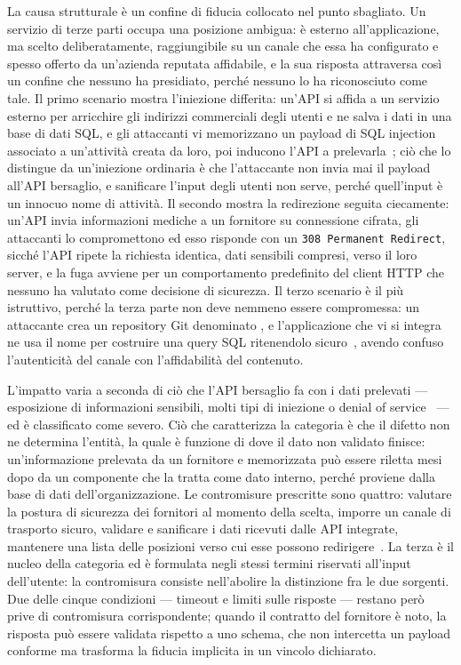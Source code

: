 La causa strutturale è un confine di fiducia collocato nel punto sbagliato. Un
servizio di terze parti occupa una posizione ambigua: è esterno
all'applicazione, ma scelto deliberatamente, raggiungibile su un canale che
essa ha configurato e spesso offerto da un'azienda reputata affidabile, e la
sua risposta attraversa così un confine che nessuno ha presidiato, perché
nessuno lo ha riconosciuto come tale. Il primo scenario mostra l'iniezione
differita: un'API si affida a un servizio esterno per arricchire gli indirizzi
commerciali degli utenti e ne salva i dati in una base di dati SQL, e gli
attaccanti vi memorizzano un payload di SQL injection associato a un'attività
creata da loro, poi inducono l'API a prelevarla~\cite{owasp2023api10}; ciò che
lo distingue da un'iniezione ordinaria è che l'attaccante non invia mai il
payload all'API bersaglio, e sanificare l'input degli utenti non serve, perché
quell'input è un innocuo nome di attività. Il secondo mostra la redirezione
seguita ciecamente: un'API invia informazioni mediche a un fornitore su
connessione cifrata, gli attaccanti lo compromettono ed esso risponde con un
\texttt{308 Permanent Redirect}, sicché l'API ripete la richiesta identica,
dati sensibili compresi, verso il loro server, e la fuga avviene per un
comportamento predefinito del client HTTP che nessuno ha valutato come
decisione di sicurezza. Il terzo scenario è il più istruttivo, perché la terza
parte non deve nemmeno essere compromessa: un attaccante crea un repository Git
denominato , e l'applicazione che vi si integra ne usa il
nome per costruire una query SQL ritenendolo sicuro~\cite{owasp2023api10},
avendo confuso l'autenticità del canale con l'affidabilità del contenuto.

L'impatto varia a seconda di ciò che l'API bersaglio fa con i dati prelevati
--- esposizione di informazioni sensibili, molti tipi di iniezione o denial of
service~\cite{owasp2023api10} --- ed è classificato come severo. Ciò che
caratterizza la categoria è che il difetto non ne determina l'entità, la quale
è funzione di dove il dato non validato finisce: un'informazione prelevata da
un fornitore e memorizzata può essere riletta mesi dopo da un componente che la
tratta come dato interno, perché proviene dalla base di dati
dell'organizzazione. Le contromisure prescritte sono quattro: valutare la
postura di sicurezza dei fornitori al momento della scelta, imporre un canale
di trasporto sicuro, validare e sanificare i dati ricevuti dalle API integrate,
mantenere una lista delle posizioni verso cui esse possono
redirigere~\cite{owasp2023api10}. La terza è il nucleo della categoria ed è
formulata negli stessi termini riservati all'input dell'utente: la contromisura
consiste nell'abolire la distinzione fra le due sorgenti. Due delle cinque
condizioni --- timeout e limiti sulle risposte --- restano però prive di
contromisura corrispondente; quando il contratto del fornitore è noto, la
risposta può essere validata rispetto a uno schema, che non intercetta un
payload conforme ma trasforma la fiducia implicita in un vincolo dichiarato.

